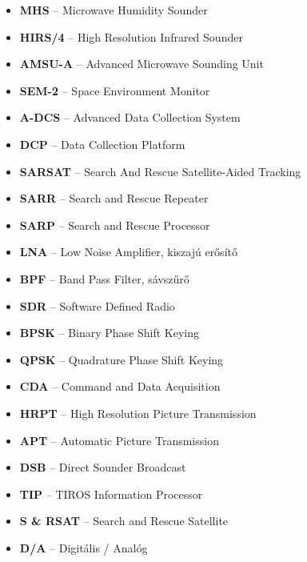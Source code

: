 \documentclass[a4paper,11pt]{article}
\begin{document}
\begin{itemize}
  \item \textbf{MHS} – Microwave Humidity Sounder
  \item \textbf{HIRS/4} – High Resolution Infrared Sounder
  \item \textbf{AMSU-A} – Advanced Microwave Sounding Unit
  \item \textbf{SEM-2} – Space Environment Monitor
  \item \textbf{A-DCS} – Advanced Data Collection System
  \item \textbf{DCP} – Data Collection Platform
  \item \textbf{SARSAT} – Search And Rescue Satellite-Aided Tracking
  \item \textbf{SARR} – Search and Rescue Repeater
  \item \textbf{SARP} – Search and Rescue Processor
  \item \textbf{LNA} – Low Noise Amplifier, kiszajú erősítő
  \item \textbf{BPF} – Band Pass Filter, sávszűrő
  \item \textbf{SDR} – Software Defined Radio
  \item \textbf{BPSK} – Binary Phase Shift Keying
  \item \textbf{QPSK} – Quadrature Phase Shift Keying
  \item \textbf{CDA} – Command and Data Acquisition
  \item \textbf{HRPT} – High Resolution Picture Transmission
  \item \textbf{APT} – Automatic Picture Transmission
  \item \textbf{DSB} – Direct Sounder Broadcast
  \item \textbf{TIP} – TIROS Information Processor
  \item \textbf{S \& RSAT} – Search and Rescue Satellite
  \item \textbf{D/A} – Digitális / Analóg
\end{itemize}




\end{document}

